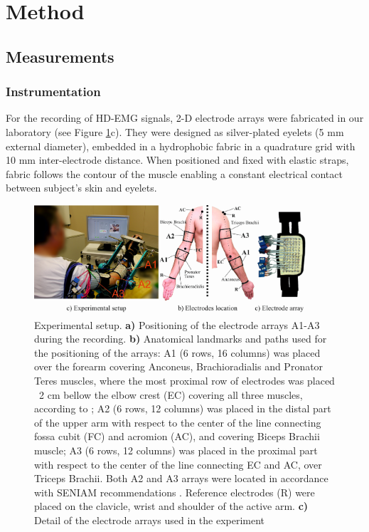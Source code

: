 \clearpage 
\section{Method}

\subsection{Measurements}

\subsubsection{Instrumentation}
For the recording of HD-EMG signals, 2-D electrode arrays were fabricated in our laboratory (see Figure \ref{fig:1-1}c). They were designed as silver-plated eyelets (5 mm external diameter), embedded in a hydrophobic fabric in a quadrature grid with 10 mm inter-electrode distance. When positioned and fixed with elastic straps, fabric follows the contour of the muscle enabling a constant electrical contact between subject’s skin and eyelets.

\begin{figure}[ht]
\centering
\includegraphics[width=0.9\textwidth]{Images/figure1_1.png}
\caption{Experimental setup. \textbf{a)} Positioning of the electrode arrays A1-A3 during the recording. \textbf{b)} Anatomical landmarks and paths used for the positioning of the arrays: A1 (6 rows, 16 columns) was placed over the forearm covering Anconeus, Brachioradialis and Pronator Teres muscles, where the most proximal row of electrodes was placed ~2 cm bellow the elbow crest (EC) covering all three muscles, according to \citet{Kendall1993}; A2 (6 rows, 12 columns) was placed in the distal part of the upper arm with respect to the center of the line connecting fossa cubit (FC) and acromion (AC), and covering Biceps Brachii muscle; A3 (6 rows, 12 columns) was placed in the proximal part with respect to the center of the line connecting EC and AC, over Triceps Brachii. Both A2 and A3 arrays were located in accordance with SENIAM recommendations \citep{Hermens1999}. Reference electrodes (R) were placed on the clavicle, wrist and shoulder of the active arm. \textbf{c)} Detail of the electrode arrays used in the experiment
}
\label{fig:1-1}
\end{figure}      


